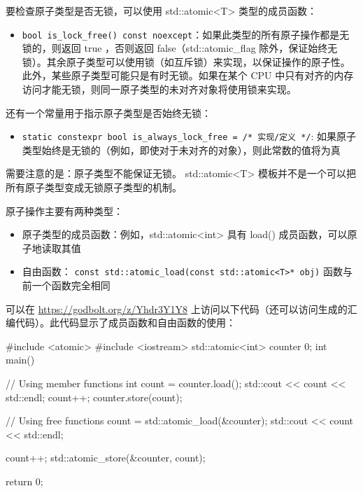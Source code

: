 要检查原子类型是否无锁，可以使用 std::atomic<T> 类型的成员函数：

\begin{itemize}
\item
\verb|bool is_lock_free() const noexcept|：如果此类型的所有原子操作都是无锁的，则返回 true ，否则返回 false（std::atomic\_flag 除外，保证始终无锁）。其余原子类型可以使用锁（如互斥锁）来实现，以保证操作的原子性。此外，某些原子类型可能只是有时无锁。如果在某个 CPU 中只有对齐的内存访问才能无锁，则同一原子类型的未对齐对象将使用锁来实现。
\end{itemize}

还有一个常量用于指示原子类型是否始终无锁：

\begin{itemize}
\item
\verb|static constexpr bool is_always_lock_free = /* 实现/定义 */|: 如果原子类型始终是无锁的（例如，即使对于未对齐的对象），则此常数的值将为真
\end{itemize}

需要注意的是：原子类型不能保证无锁。 std::atomic<T> 模板并不是一个可以把所有原子类型变成无锁原子类型的机制。


原子操作主要有两种类型：

\begin{itemize}
\item
原子类型的成员函数：例如，std::atomic<int> 具有 load() 成员函数，可以原子地读取其值

\item
自由函数： \verb|const std::atomic_load(const std::atomic<T>* obj)| 函数与前一个函数完全相同
\end{itemize}

可以在 \url{https://godbolt.org/z/Yhdr3Y1Y8} 上访问以下代码（还可以访问生成的汇编代码）。此代码显示了成员函数和自由函数的使用：

\begin{cpp}
#include <atomic>
#include <iostream>
std::atomic<int> counter {0};
int main() {
    // Using member functions
    int count = counter.load();
    std::cout << count << std::endl;
    count++;
    counter.store(count);

    // Using free functions
    count = std::atomic_load(&counter);
    std::cout << count << std::endl;

    count++;
    std::atomic_store(&counter, count);

    return 0;
}
\end{cpp}


